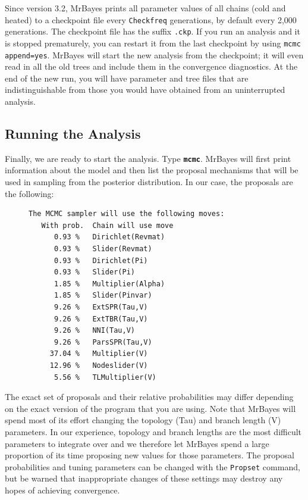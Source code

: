 \documentclass[12pt]{book}
\newcommand{\ttt}[1]{\texttt{#1}}
\newcommand{\tb}[1]{\ttt{\textbf{#1}}}
\begin{document}
Since version 3.2, MrBayes prints all parameter values of all chains (cold and heated) to a
checkpoint file every \texttt{Checkfreq} generations, by default every 2,000 generations. The
checkpoint file has the suffix \texttt{.ckp}. If you run an analysis and it is stopped prematurely,
you can restart it from the last checkpoint by using \texttt{mcmc append=yes}. MrBayes will start
the new analysis from the checkpoint; it will even read in all the old trees and include them in
the convergence diagnostics. At the end of the new run, you will have parameter and tree files that
are indistinguishable from those you would have obtained from an uninterrupted analysis.

\subsection{Running the Analysis}

Finally, we are ready to start the analysis. Type \tb{mcmc}. MrBayes will first print information
about the model and then list the proposal mechanisms that will be used in sampling from the
posterior distribution. In our case, the proposals are the following:

\begin{figure}[h]
\centering
\begin{BVerbatim}
The MCMC sampler will use the following moves:
   With prob.  Chain will use move
      0.93 %   Dirichlet(Revmat)
      0.93 %   Slider(Revmat)
      0.93 %   Dirichlet(Pi)
      0.93 %   Slider(Pi)
      1.85 %   Multiplier(Alpha)
      1.85 %   Slider(Pinvar)
      9.26 %   ExtSPR(Tau,V)
      9.26 %   ExtTBR(Tau,V)
      9.26 %   NNI(Tau,V)
      9.26 %   ParsSPR(Tau,V)
     37.04 %   Multiplier(V)
     12.96 %   Nodeslider(V)
      5.56 %   TLMultiplier(V)
\end{BVerbatim}
\end{figure}

The exact set of proposals and their relative probabilities may differ depending on the exact
version of the program that you are using. Note that MrBayes will spend most of its effort changing
the topology (Tau) and branch length (V) parameters. In our experience, topology and branch lengths
are the most difficult parameters to integrate over and we therefore let MrBayes spend a large
proportion of its time proposing new values for those parameters. The proposal probabilities and
tuning parameters can be changed with the \texttt{Propset} command, but be warned that
inappropriate changes of these settings may destroy any hopes of achieving convergence.
\end{document}
